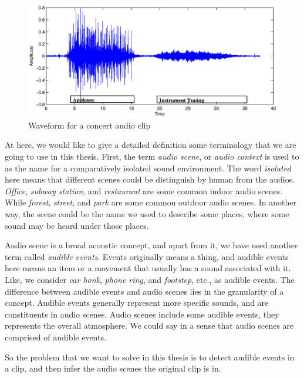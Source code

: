 \begin{figure}[htb]
\centering
\includegraphics[scale=0.6]{figure/intro/waveform}
\caption{Waveform for a concert audio clip}
\label{fig:waveform}
\end{figure}

At here, we would like to give a detailed definition some terminology that we are going to use in this thesis. 
First, the term \textit{audio scene}, or \textit{audio context} is used to as the name for a comparatively isolated sound environment. 
The word \textit{isolated} here means that different scenes could be distinguish by human from the audios.  
\textit{Office}, \textit{subway station}, and \textit{restaurant} are some common indoor audio scenes. 
While \textit{forest}, \textit{street}, and \textit{park} are some common outdoor audio scenes. 
In another way, the scene could be the name we used to describe some places, where some sound may be heard under those places. 
 
Audio scene is a broad acoustic concept, and apart from it, we have used another term called \textit{audible events}. 
Events originally means a thing, and audible events here means an item or a movement that usually has a sound associated with it. 
Like, we consider \textit{car honk}, \textit{phone ring}, and \textit{footstep}, etc., as audible events. 
The difference between audible events and audio scenes lies in the granularity of a concept. 
Audible events generally represent more specific sounds, and are constituents in audio scenes. 
Audio scenes include some audible events, they represents the overall atmosphere. 
We could say in a sense that audio scenes are comprised of audible events. 

So the problem that we want to solve in this thesis is to detect audible events in a clip, and then infer the audio scenes the original clip is in. 

